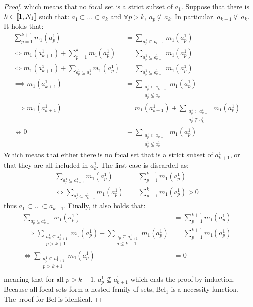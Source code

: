\begin{proof}
    which means that no focal set is a strict subset of $a_1$.
    Suppose that there is $k\in{[\![}1,N_1{]\!]}$ such that: $a_1\subset\dots\subset a_k$ and $\forall p>k,~a_p\not\subseteq a_k$. In particular, $a_{k+1}\not\subseteq a_k$. It holds that:
    \begin{align*}
        \sum_{p=1}^{k+1}m_1(a^1_p) &= \sum_{a^1_p\subseteq a^1_{k+1}}m_1(a^1_p)\\
        \Leftrightarrow m_1(a^1_{k+1}) + \sum_{p=1}^{k} m_1(a^1_p) &= \sum_{a^1_p\subseteq a^1_{k+1}}m_1(a^1_p)\\
        \Leftrightarrow m_1(a^1_{k+1}) + \sum_{a^1_p\subseteq a^1_k} m_1(a^1_p) &= \sum_{a^1_p\subseteq a^1_{k+1}}m_1(a^1_p)\\
        \implies m_1(a^1_{k+1}) &= \sum_{\substack{a^1_p\subseteq a^1_{k+1} \\ a^1_p\not\subseteq a^1_k}} m_1(a^1_p)\\
        \implies m_1(a^1_{k+1}) &= m_1(a^1_{k+1}) + \sum_{\substack{a^1_p\subset a^1_{k+1} \\ a^1_p\not\subseteq a^1_k}} m_1(a^1_p)\\
        \Leftrightarrow 0 &= \sum_{\substack{a^1_p\subset a^1_{k+1} \\ a^1_p\not\subseteq a^1_k}} m_1(a^1_p)
    \end{align*}
    Which means that either there is no focal set that is a strict subset of $a^1_{k+1}$, or that they are all included in $a^1_{k}$. The first case is discarded as:
    \begin{align*}
        \sum_{a^1_p\subseteq a^1_{k+1}}m_1(a^1_p) &= \sum_{p=1}^{k+1}m_1(a^1_p)\\
        \Leftrightarrow \sum_{a^1_p\subset a^1_{k+1}}m_1(a^1_p) &= \sum_{p=1}^{k}m_1(a^1_p)>0
    \end{align*}
    thus $a_1\subset\dots\subset a_{k+1}$.
    Finally, it also holds that:
    \begin{align*}
        \sum_{a^1_p\subseteq a^1_{k+1}}m_1(a^1_p) &= \sum_{p=1}^{k+1}m_1(a^1_p)\\
        \implies \sum_{\substack{a^1_p\subseteq a^1_{k+1} \\ p>k+1}} m_1(a^1_p) + \sum_{\substack{a^1_p\subseteq a^1_{k+1} \\ p\leqslant k+1}} m_1(a^1_p) &= \sum_{p=1}^{k+1}m_1(a^1_p)\\
        \Leftrightarrow \sum_{\substack{a^1_p\subseteq a^1_{k+1} \\ p>k+1}} m_1(a^1_p) &= 0\\
    \end{align*}
    meaning that for all $p>k+1$, $a^1_p\not\subseteq a^1_{k+1}$ which ends the proof by induction. Because all focal sets form a nested family of sets, $\mathrm{Bel}_1$ is a necessity function. The proof for $\mathrm{Bel}$ is identical. 
\end{proof}

